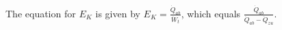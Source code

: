 The equation for \( E_K \) is given by \( E_K = \frac{\dot{Q}_{ab}}{\dot{W}_t} \), which equals \( \frac{\dot{Q}_{ab}}{\dot{Q}_{ab} - \dot{Q}_{zu}} \).